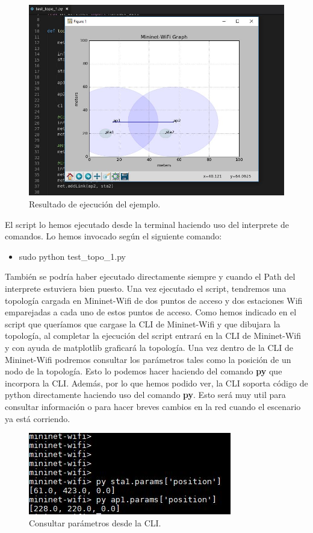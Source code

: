 \begin{figure}[!htb]
  \centering
    \includegraphics[width=0.9\linewidth]{./img/19.JPG}
    \caption{Resultado de ejecución del ejemplo.}
  \label{fig:yo}
\end{figure}
El script lo hemos ejecutado desde la terminal haciendo uso del interprete de comandos. Lo hemos invocado según el siguiente comando:
\begin{itemize}
    \item sudo python test\_topo\_1.py
\end{itemize}
También se podría haber ejecutado directamente siempre y cuando el Path del interprete estuviera bien puesto. Una vez ejecutado el script, tendremos una topología cargada en Mininet-Wifi de dos puntos de acceso y dos estaciones Wifi emparejadas a cada uno de estos puntos de acceso. \newline
\newline
Como hemos indicado en el script que queríamos que cargase la CLI de Mininet-Wifi y que dibujara la topología, al completar la ejecución del script entrará en la CLI de Mininet-Wifi y con ayuda de matplotlib graficará la topología.
Una vez dentro de la CLI de Mininet-Wifi podremos consultar los parámetros tales como la posición de un nodo de la topología. Esto lo podemos hacer haciendo del comando \textbf{py} que incorpora la CLI. Además, por lo que hemos podido ver, la CLI soporta código de python directamente haciendo uso del comando \textbf{py}. Esto será muy util para consultar información o para hacer breves cambios en la red cuando el escenario ya está corriendo.
\newpage
\begin{figure}[!htb]
  \centering
    \includegraphics[width=0.6\linewidth]{./img/20.JPG}
    \caption{Consultar parámetros desde la CLI.}
  \label{fig:yo}
\end{figure}

